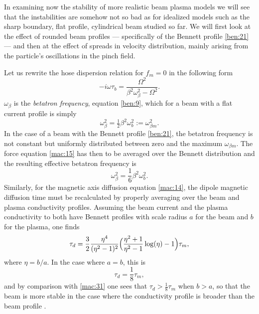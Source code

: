\documentclass [12pt,a4paper,     ]{report} %
\newcommand{\DEF}{:=}                 %
\newcommand{\Oh}{\tfrac{1}{2}}        %
\begin{document}
	In examining now the stability of more realistic beam plasma models we will see that the instabilities are somehow not so bad as for idealized models such as the sharp boundary, flat profile, cylindrical beam studied so far.  We will first look at the effect of rounded beam profiles --- specifically of the Bennett profile \eqref{ben:21} --- and then at the effect of spreads in velocity distribution, mainly arising from the particle's oscillations in the pinch field.

	Let us rewrite the hose dispersion relation for $f_m=0$ in the following form
%
\begin{equation}\label{mac:28} %
      -i\omega\tau_b = 
        \frac{\Omega^2}
             {\beta^2\omega_{\beta}^2 - \Omega^2}.
\end{equation}
%
$\omega_\beta$ is the \emph{betatron frequency}, equation \eqref{ben:9}, which for a beam with a flat current profile is simply
%
\begin{equation}\label{mac:29} %
        \omega_\beta^2 = \Oh\beta^2\omega_b^2 \DEF \omega_{\beta m}^2.
\end{equation}
%
In the case of a beam with the Bennett profile \eqref{ben:21}, the betatron frequency is not constant but uniformly distributed between zero and the maximum $\omega_{\beta m}$.  The force equation \eqref{mac:15} has then to be averaged over the Bennett distribution and the resulting effective betatron frequency is \cite{LEE--1978-}
%
\begin{equation}\label{mac:30} %
    \omega_\beta^2  = \frac{1}{6}\beta^2\omega_b^2.
\end{equation}
%
Similarly, for the magnetic axis diffusion equation \eqref{mac:14}, the dipole magnetic diffusion time must be recalculated by properly averaging over the beam and plasma conductivity profiles.  Assuming the beam current and the plasma conductivity to both have Bennett profiles with scale radius $a$ for the beam and $b$ for the plasma, one finds
%
\begin{equation}\label{mac:31} %
    \tau_d = \frac{3}{2} \frac{\eta^4}{(\eta^2-1)^2}
             \Bigl(\frac{\eta^2+1}{\eta^2-1} \log(\eta) -1 \Bigr)\tau_m,
\end{equation}
%
where $\eta=b/a$.  In the case where $a=b$, this is
%
\begin{equation}\label{mac:32} %
                                \tau_d = \frac{1}{8} \tau_m,
\end{equation}
%
and by comparison with \eqref{mac:31} one sees that $\tau_d > \frac{1}{8}\tau_m$ when $b>a$, so that the beam is more stable in the case where the conductivity profile is broader than the beam profile \cite{LAMPE1981-}.
\end{document}
